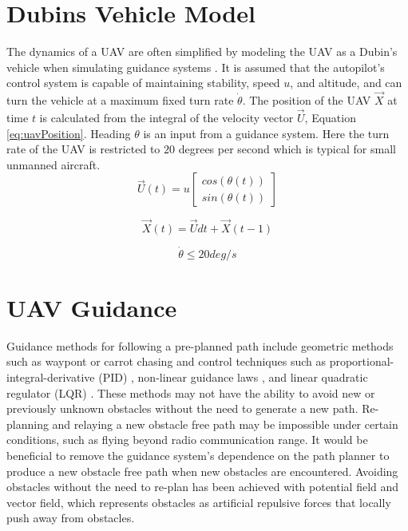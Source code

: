 \documentclass[numbered,pdftex]{ohio-etd}
\begin{document}
\section{Dubins Vehicle Model}
The dynamics of a UAV are often simplified by modeling the UAV as a Dubin's vehicle when simulating guidance systems \cite{frew_cooperative_2007,griffiths_vector_2006,nelson_cooperative_2005,nelson_vector_2006,nelson_vector_2007}. It is assumed that the autopilot's control system is capable of maintaining stability, speed $u$, and altitude, and can turn the vehicle at a maximum fixed turn rate $\dot{\theta}$. The position of the UAV $\overrightarrow{X}$ at time $t$ is calculated from the integral of the velocity vector $\overrightarrow{U}$, Equation \ref{eq:uavPosition}. Heading $\theta$ is an input from a guidance system. Here the turn rate of the UAV is restricted to $20$ degrees per second which is typical for small unmanned aircraft.
\begin{equation}
\label{eq:uavVelocity}
\overrightarrow{U}(t) = u \begin{bmatrix}
cos(\theta(t)) \\
sin(\theta(t))
\end{bmatrix}
\end{equation}


\begin{equation}
\label{eq:uavPosition}
\overrightarrow{X}(t) = \overrightarrow{U}dt + \overrightarrow{X}(t-1)
\end{equation}


\begin{equation}
\label{turnRate}
\dot{\theta} \leq 20 deg/s
\end{equation}


\section{UAV Guidance}
Guidance methods for following a pre-planned path include geometric methods such as waypont \cite{osborne_waypoint_2005} or carrot chasing \cite{manjunath_application_2016} and control techniques such as proportional-integral-derivative (PID) \cite{rhee2010tight}, non-linear guidance laws \cite{park2007performance}, and linear quadratic regulator (LQR) \cite{ratnoo_adaptive_2011}. These methods may not have the ability to avoid new or previously unknown obstacles without the need to generate a new path. Re-planning and relaying a new obstacle free path may be impossible under certain conditions, such as flying beyond radio communication range. It would be beneficial to remove the guidance system's dependence on the path planner to produce a new obstacle free path when new obstacles are encountered. Avoiding obstacles without the need to re-plan has been achieved with potential field and vector field, which represents obstacles as artificial repulsive forces that locally push away from obstacles. 
\end{document}
